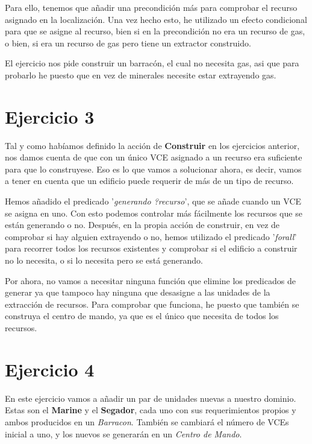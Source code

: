 \documentclass[11pt,a4paper]{article}
\begin{document}
Para ello, tenemos que añadir una precondición más para comprobar el recurso asignado en la localización. Una vez hecho esto, he
utilizado un efecto condicional para que se asigne al recurso, bien si en la precondición no era un recurso de gas, o bien, si
era un recurso de gas pero tiene un extractor construido.

El ejercicio nos pide construir un barracón, el cual no necesita gas, asi que para probarlo he puesto que en vez de minerales
necesite estar extrayendo gas.


\section*{Ejercicio 3}
Tal y como habíamos definido la acción de \textbf{Construir} en los ejercicios anterior, nos damos cuenta de que con un único VCE
asignado a un recurso era suficiente para que lo construyese. Eso es lo que vamos a solucionar ahora, es decir, vamos a tener en
cuenta que un edificio puede requerir de más de un tipo de recurso.

Hemos añadido el predicado '\textit{generando ?recurso}', que se añade cuando un VCE se asigna en uno. Con esto podemos controlar
más fácilmente los recursos que se están generando o no. Después, en la propia acción de construir, en vez de comprobar si hay
alguien extrayendo o no, hemos utilizado el predicado '\textit{forall}' para recorrer todos los recursos existentes y comprobar
si el edificio a construir no lo necesita, o si lo necesita pero se está generando.

Por ahora, no vamos a necesitar ninguna función que elimine los predicados de generar ya que tampoco hay ninguna que desasigne a
las unidades de la extracción de recursos. Para comprobar que funciona, he puesto que también se construya el centro de mando, ya
que es el único que necesita de todos los recursos.


\section*{Ejercicio 4}
En este ejercicio vamos a añadir un par de unidades nuevas a nuestro dominio. Estas son el \textbf{Marine} y el \textbf{Segador},
cada uno con sus requerimientos propios y ambos producidos en un \textit{Barracon}. También se cambiará el número de VCEs inicial
a uno, y los nuevos se generarán en un \textit{Centro de Mando}.
\end{document}
